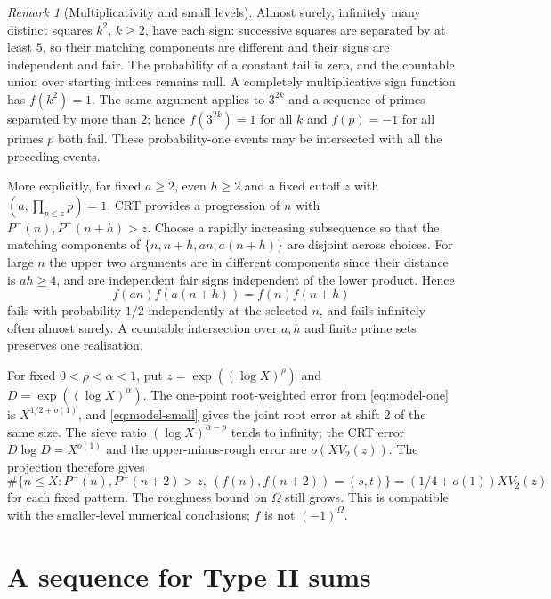 \documentclass[11pt]{article}
\theoremstyle{definition}
\theoremstyle{remark}
\newtheorem{remark}[theorem]{Remark}
\numberwithin{equation}{section}
\begin{document}
\begin{remark}[Multiplicativity and small levels]\label{rem:b-compatibility}
Almost surely, infinitely many distinct squares $k^2$, $k\ge2$, have each sign: successive squares
are separated by at least $5$, so their matching components are different and their signs are independent
and fair. The probability of a constant tail is zero, and the countable union over starting indices remains
null. A completely multiplicative sign function has $f(k^2)=1$.
The same argument applies to $3^{2k}$ and a sequence of primes separated by more than $2$;
hence $f(3^{2k})=1$ for all $k$ and $f(p)=-1$ for all primes $p$ both fail.
These probability-one events may be intersected with all the preceding events.

More explicitly, for fixed $a\ge2$, even $h\ge2$ and a fixed cutoff $z$ with $(a,\prod_{p\le z}p)=1$,
CRT provides a progression of $n$ with $P^-(n),P^-(n+h)>z$.
Choose a rapidly increasing subsequence so that the matching components of
$\{n,n+h,an,a(n+h)\}$ are disjoint across choices. For large $n$ the upper two arguments are in
different components since their distance is $ah\ge4$, and are independent fair signs independent of
the lower product. Hence
\begin{equation}\label{eq:b-dilation}
 f(an)f(a(n+h))=f(n)f(n+h)
\end{equation}
fails with probability $1/2$ independently at the selected $n$, and fails infinitely often almost surely.
A countable intersection over $a,h$ and finite prime sets preserves one realisation.

For fixed $0<\rho<\alpha<1$, put $z=\exp((\log X)^\rho)$ and $D=\exp((\log X)^\alpha)$.
The one-point root-weighted error from \eqref{eq:model-one} is $X^{1/2+o(1)}$, and
\eqref{eq:model-small} gives the joint root error at shift $2$ of the same size.
The sieve ratio $(\log X)^{\alpha-\rho}$ tends to infinity; the CRT error $D\log D=X^{o(1)}$ and the
upper-minus-rough error are $o(XV_2(z))$. The projection therefore gives
\begin{equation}\label{eq:b-rough-patterns}
 \#\{n\le X:P^-(n),P^-(n+2)>z,\ (f(n),f(n+2))=(s,t)\}
 =(1/4+o(1))XV_2(z)
\end{equation}
for each fixed pattern. The roughness bound on $\Omega$ still grows.
This is compatible with the smaller-level numerical conclusions; $f$ is not $(-1)^\Omega$.
\end{remark}

\section{A sequence for Type II sums}\label{sec:type}
\end{document}
